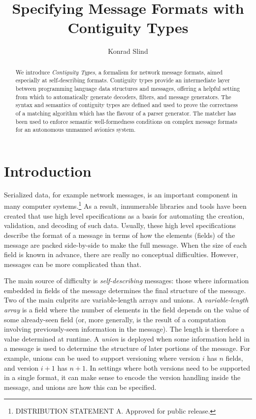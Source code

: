 \documentclass[a4paper,UKenglish,cleveref, autoref, thm-restate]{lipics-v2021}
\title{Specifying Message Formats with Contiguity Types} %
\author{Konrad Slind}{Trusted Systems Group, Collins Aerospace, USA}{konrad.slind@collins.com}{}{}
\begin{document}
\maketitle


\begin{abstract}
We introduce \emph{Contiguity Types}, a formalism for network message
formats, aimed especially at self-describing formats. Contiguity types
provide an intermediate layer between programming language data
structures and messages, offering a helpful setting from which to
automatically generate decoders, filters, and message generators.  The
syntax and semantics of contiguity types are defined and used to prove
the correctness of a matching algorithm which has the flavour of a
parser generator. The matcher has been used to enforce semantic
well-formedness conditions on complex message formats for an
autonomous unmanned avionics system.
\end{abstract}


\section{Introduction}\label{sec:intro}

Serialized data, for example network messages, is an important
component in many computer systems.\footnote{DISTRIBUTION STATEMENT
  A. Approved for public release.}  As a result, innumerable libraries
and tools have been created that use high level specifications as a
basis for automating the creation, validation, and decoding of such
data. Usually, these high level specifications describe the format of
a message in terms of how the elements (fields) of the message are
packed side-by-side to make the full message. When the size of each
field is known in advance, there are really no conceptual
difficulties. However, messages can be more complicated than that.

The main source of difficulty is \emph{self-describing} messages:
those where information embedded in fields of the message determines
the final structure of the message. Two of the main culprits are
variable-length arrays and unions. A \emph{variable-length array} is a
field where the number of elements in the field depends on the value
of some already-seen field (or, more generally, is the result of a
computation involving previously-seen information in the message).
The length is therefore a value determined at runtime. A \emph{union}
is deployed when some information held in a message is used to
determine the structure of later portions of the message. For example,
unions can be used to support versioning where version $i$ has $n$
fields, and version $i+1$ has $n+1$. In settings where both versions
need to be supported in a single format, it can make sense to encode
the version handling inside the message, and unions are how this can
be specified.
\end{document}
